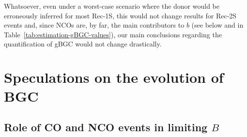 Whatsoever, even under a worst-case scenario where the donor would be erroneously inferred for most Rec-1S, this would not change results for Rec-2S events and, since NCOs are, by far, the main contributors to $b$ (see below and in Table~\ref{tab:estimation-gBGC-values}), our main conclusions regarding the quantification of gBGC would not change drastically.










\section{Speculations on the evolution of BGC}
\subsection{Role of CO and NCO events in limiting $B$}


